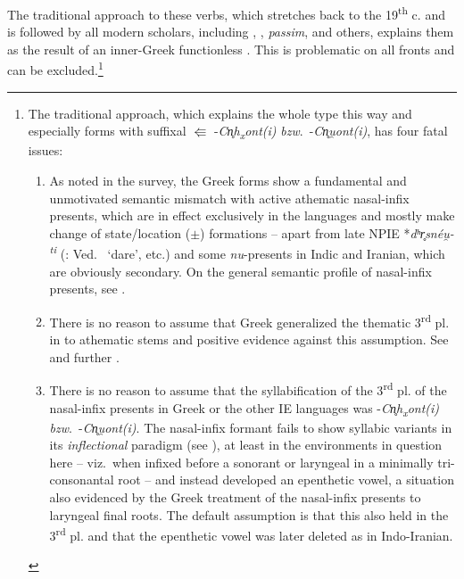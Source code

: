 \documentclass[output=paper,colorlinks,citecolor=brown]{langscibook}
\begin{document}
The traditional approach to these verbs, which stretches back to the 19\textsuperscript{th} c. and is followed by all modern scholars, including  \citealt{Klingenschmitt1982}, \citealt{Rix1992},   \textit{passim}, and others, explains them as the result of an inner-Greek functionless . This is problematic on all fronts and can be excluded.\footnote{\label{fn:themat}The traditional approach, which explains the whole type this way and especially forms with suffixal   $\Lleftarrow$ -\textit{Cn̥h\textsubscript{x}ont(i)} \emph{bzw}.\ -\textit{Cn̥u̯ont(i)}, has four fatal issues:
\begin{enumerate}
    \item  As noted in the survey, the Greek forms show a fundamental and unmotivated semantic mismatch with active athematic nasal-infix presents, which are in effect exclusively  in the languages and mostly make   change of state/location ($\pm$) formations -- apart from late NPIE *\textit{dʰr̥snéu̯-\textsuperscript{ti}}  (: Ved.\  ‘dare', etc.) and some \textit{nu}-presents  in Indic and Iranian, which are obviously secondary. On the general semantic profile of nasal-infix presents, see \citealt{Meiser1993}. 
    \item There is no reason to assume that Greek generalized the thematic 3\textsuperscript{rd} pl. in  to athematic stems and positive evidence against this assumption. See \citealt{Peters2004} and further \citealt[286--298]{Willi2018}.
    \item There is no reason to assume that the syllabification of the 3\textsuperscript{rd} pl. of the nasal-infix presents  in Greek or the other IE languages was -\textit{Cn̥h\textsubscript{x}}\textit{ont(i)} \emph{bzw}.\ -\textit{Cn̥u̯ont(i)}. The nasal-infix formant fails to show syllabic variants in its \textit{inflectional} paradigm (see  \citealt{Praust2004}), at least in the environments in question here -- viz.\ when infixed before a sonorant or laryngeal in a minimally tri-consonantal root -- and instead developed an epenthetic vowel, a situation also evidenced by the Greek treatment of the nasal-infix presents  to laryngeal final roots. The default assumption is that this also held in the 3\textsuperscript{rd} pl. and that the epenthetic vowel was later deleted as in Indo-Iranian.

\end{enumerate}}
\end{document}
